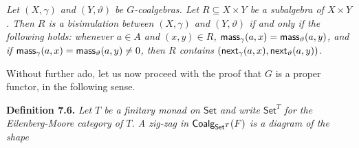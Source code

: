 \documentclass[11pt,a4paper]{amsart}
\begin{document}
\hypertarget{html:S7.Thmtheorem5.p1}{} \emph{Let %
\hypertarget{html:S7.Thmtheorem5.p1.m1}{}\({(X,\gamma)}\) and %
\hypertarget{html:S7.Thmtheorem5.p1.m2}{}\({(Y,\vartheta)}\) be %
\hypertarget{html:S7.Thmtheorem5.p1.m3}{}\({G}\)-coalgebras. Let %
\hypertarget{html:S7.Thmtheorem5.p1.m4}{}\({R\subseteq X\times Y}\) be a subalgebra of %
\hypertarget{html:S7.Thmtheorem5.p1.m5}{}\({X\times Y}\). Then %
\hypertarget{html:S7.Thmtheorem5.p1.m6}{}\({R}\) is a bisimulation between %
\hypertarget{html:S7.Thmtheorem5.p1.m7}{}\({(X,\gamma)}\) and %
\hypertarget{html:S7.Thmtheorem5.p1.m8}{}\({(Y,\vartheta)}\) if and only if the following holds: whenever %
\hypertarget{html:S7.Thmtheorem5.p1.m9}{}\({a\in A}\) and %
\hypertarget{html:S7.Thmtheorem5.p1.m10}{}\({(x,y)\in R}\), %
\hypertarget{html:S7.Thmtheorem5.p1.m11}{}\({\mbox{\sf mass}_{\gamma}(a,x)=\mbox{\sf mass}_{\vartheta}(a,y)}\), and if %
\hypertarget{html:S7.Thmtheorem5.p1.m12}{}\({\mbox{\sf mass}_{\gamma}(a,x)=\mbox{\sf mass}_{\vartheta}(a,y)\neq 0}\), then %
\hypertarget{html:S7.Thmtheorem5.p1.m13}{}\({R}\) contains %
\hypertarget{html:S7.Thmtheorem5.p1.m14}{}\({(\mbox{\sf next}_{\gamma}(a,x),\mbox{\sf next}_{\vartheta}(a,y))}\).}
\par\medskip
\hypertarget{html:S7.SS0.SSS0.P0.SPx3.p4}{} Without further ado, let us now proceed with the proof that %
\hypertarget{html:S7.SS0.SSS0.P0.SPx3.p4.m1}{}\({G}\) is a proper functor, in the following sense.
\par\medskip
\hypertarget{html:S7.Thmtheorem6}{} \par\noindent\textbf{\textbf{Definition 7.6}\textbf{.}}\quad  %
\hypertarget{html:S7.Thmtheorem6.p1}{} \emph{Let %
\hypertarget{html:S7.Thmtheorem6.p1.m1}{}\({T}\) be a finitary monad on %
\hypertarget{html:S7.Thmtheorem6.p1.m2}{}\({\mathsf{Set}}\) and write %
\hypertarget{html:S7.Thmtheorem6.p1.m3}{}\({\mathsf{Set}^{T}}\) for the Eilenberg-Moore category of %
\hypertarget{html:S7.Thmtheorem6.p1.m4}{}\({T}\). A \emph{zig-zag} in %
\hypertarget{html:S7.Thmtheorem6.p1.m5}{}\({\mbox{\sf Coalg}_{\mathsf{Set}^{T}}(F)}\) is a diagram of the shape}
\end{document}
